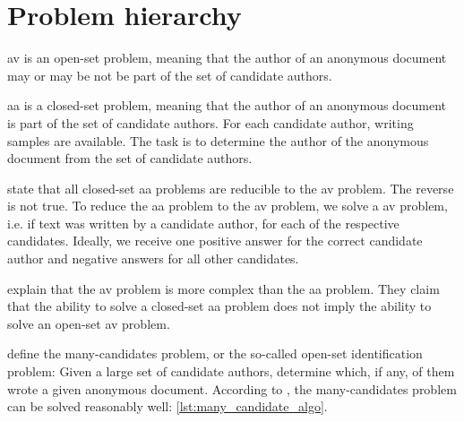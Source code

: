 \section{Problem hierarchy}
\label{sec:problem_hierarchy}


\ac{av} is an open-set problem, meaning that the author of an anonymous document 
may or may be not be part of the set of candidate authors.

\ac{aa} is a closed-set problem, meaning that the author of an anonymous document
is part of the set of candidate authors.
For each candidate author, writing samples are available.
The task is to determine the author of the anonymous document from the set of candidate authors.

\citet{koppel_determining_2014} state that all closed-set \ac{aa} problems are reducible to the \ac{av} problem.
The reverse is not true.
To reduce the \ac{aa} problem to the \ac{av} problem, we solve a \ac{av} problem, i.e. if text was written by a candidate author, 
for each of the respective candidates.
Ideally, we receive one positive answer for the correct candidate author and negative answers for all other candidates.

\citet{koppel_determining_2014} explain that the \ac{av} problem is more complex than the \ac{aa} problem.
They claim that the ability to solve a closed-set \ac{aa} problem does not imply the ability to solve an open-set \ac{av} problem.

\citet{koppel_determining_2014} define the many-candidates problem, or the so-called open-set identification problem:
Given a large set of candidate authors, determine which, if any, of them wrote a given anonymous document.
According to \citet{koppel_determining_2014}, the many-candidates problem can be solved reasonably well: \autoref{lst:many_candidate_algo}.

